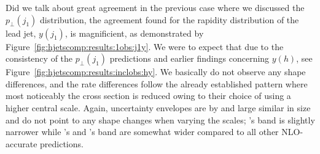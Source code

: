 
Did we talk about great agreement in the previous case where we
discussed the $p_\perp(j_1)$ distribution, the agreement found for the
rapidity distribution of the lead jet, $y(j_1)$, is magnificient, as
demonstrated by Figure~\ref{fig:hjetscomp:results:1obs:j1y}. We were
to expect that due to the consistency of the $p_\perp(j_1)$ predictions and earlier findings
concerning $y(h)$, see Figure~\ref{fig:hjetscomp:results:inclobs:hy}.
We basically do not observe any shape differences, and the rate
differences follow the already established pattern where most
noticeably the \MGaMC cross section is reduced owing to their choice
of using a higher central scale. Again, uncertainty envelopes are
by and large similar in size and do not point to any shape changes
when varying the scales; \Herwig's band is slightly narrower while
\Sherpa \MEPSatNLO's and \MGaMC's band are somewhat wider compared 
to all other NLO-accurate predictions.

